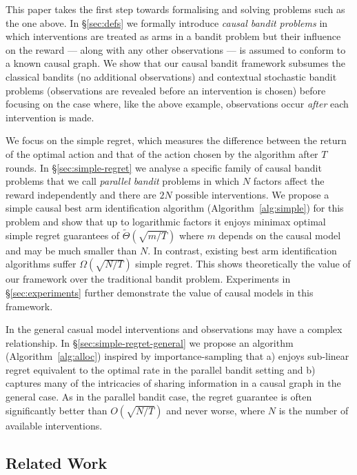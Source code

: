 This paper takes the first step towards formalising and solving problems such as the one above. 
In \S\ref{sec:defs} we formally introduce \emph{causal bandit problems} in which interventions are treated as arms in a bandit problem but their influence on the reward --- along with any other observations --- is assumed to conform to a known causal graph. 
We show that our causal bandit framework subsumes the classical bandits (no additional observations) and contextual stochastic bandit problems (observations are revealed before an intervention is chosen) before focusing on the case where, like the above example, observations occur \emph{after} each intervention is made.

We focus on the simple regret, which measures the difference between the return of the optimal action and that of the action chosen by the algorithm after $T$ rounds.
In \S\ref{sec:simple-regret} we analyse a specific family of causal bandit problems that we call \emph{parallel bandit} problems in which $N$ factors affect the reward independently and there are $2N$ possible interventions.
We propose a simple causal best arm identification algorithm (Algorithm~\ref{alg:simple}) for this problem and show that up to logarithmic factors it enjoys minimax optimal
simple regret guarantees of $\tilde\Theta(\sqrt{m/T})$ where $m$ depends on the causal model and may be much smaller than $N$.
In contrast, existing best arm identification algorithms suffer $\Omega(\sqrt{N/T})$ simple regret.
This shows theoretically the value of our framework over the traditional bandit problem. 
Experiments in \S\ref{sec:experiments} further demonstrate the value of causal models in this framework.

In the general casual model interventions and observations may have a complex relationship. 
In \S\ref{sec:simple-regret-general} we propose an algorithm (Algorithm~\ref{alg:alloc}) inspired by importance-sampling that a) enjoys sub-linear regret equivalent to the optimal rate in the parallel bandit setting and b) captures many of the intricacies of sharing information in a causal graph in the general case. 
As in the parallel bandit case, the regret guarantee is often significantly better than $O(\sqrt{N/T})$ and never worse, where $N$ is the number of available interventions.



\subsection{Related Work}

